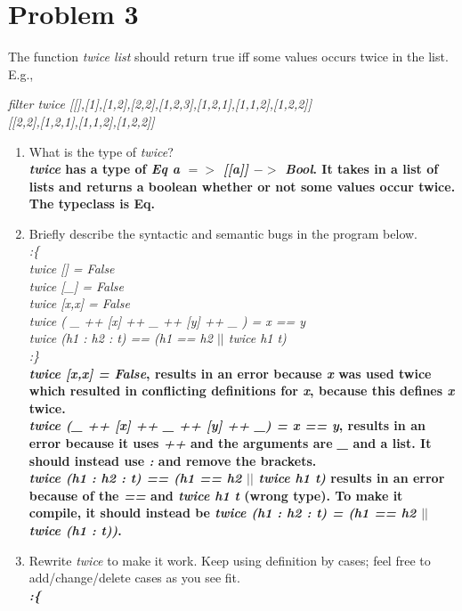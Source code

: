 \documentclass[a4paper, 12pt,fleqn]{article}
\begin{document}
\section*{Problem 3}
The function \textit{twice list} should return true iff some values occurs twice in the list. E.g.,
\begin{center}
\textit{filter twice [[],[1],[1,2],[2,2],[1,2,3],[1,2,1],[1,1,2],[1,2,2]]}\\
\textit{[[2,2],[1,2,1],[1,1,2],[1,2,2]]}
\end{center}
\begin{enumerate}[label = (\alph*)]
\item What is the type of \textit{twice}? \\
\textbf{
\textit{twice} has a type of \textit{Eq a $=>$ [[a]] $->$ Bool}. It takes in a list of lists and returns a boolean whether or not some values occur twice. The typeclass is Eq.
}
\item Briefly describe the syntactic and semantic bugs in the program below. \\
\textit{
:\{\\
twice [] = False\\
twice [\_] = False\\
twice [x,x] = False\\
twice ( \_ ++ [x] ++ \_ ++ [y] ++ \_ ) = x == y\\
twice (h1 : h2 : t) == (h1 == h2 $||$ twice h1 t)\\
:\}
}\\
\textbf{
\textit{twice [x,x] = False}, results in an error because \textit{x} was used twice which resulted in conflicting definitions for \textit{x}, because this defines \textit{x} twice.\\
\textit{twice (\_ ++ [x] ++ \_ ++ [y] ++ \_) = x == y}, results in an error because it uses \textit{++} and the arguments are \textit{\_} and a list. It should instead use \textit{:} and remove the brackets.\\
\textit{twice (h1 : h2 : t) == (h1 == h2 $||$ twice h1 t)} results in an error because of the \textit{==} and \textit{twice h1 t}  (wrong type). To make it compile, it should instead be \textit{twice (h1 : h2 : t) = (h1 == h2 $||$ twice (h1 : t))}.
}
\item Rewrite \textit{twice} to make it work. Keep using definition by cases; feel free to \\add/change/delete cases as you see fit.\\
\textbf{
\textit{:\{\\
}}
\end{enumerate}
\end{document}
